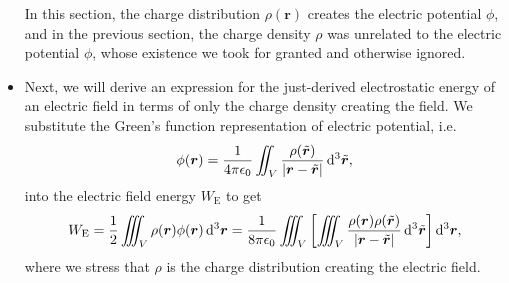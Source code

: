 \documentclass[11pt, a4paper]{article}
\newcommand{\diff}{\mathop{}\!\mathrm{d}} %
\newcommand{\dr}{\diff^{3} \r}  %
\newcommand{\dtr}{\diff^{3} \tilde{\r}}  %
\renewcommand{\vec}[1]{\bm{#1}} %
\renewcommand{\t}[1]{\tilde{#1}} %
\renewcommand{\r}{\vec{r}}
\newcommand{\ee}{\epsilon_{0}}  %
\begin{document}
\begin{itemize}
	In this section, the charge distribution $ \rho(\r) $ creates the electric potential $ \phi $, and in the previous section, the charge density $ \rho $ was unrelated to the electric potential $ \phi $, whose existence we took for granted and otherwise ignored.
	
	\item Next, we will derive an expression for the just-derived electrostatic energy of an electric field in terms of only the charge density creating the field. We substitute the Green's function representation of electric potential, i.e.
	\begin{equation*}
		\phi(\r) = \frac{1}{4\pi \ee}\iint_{V} \frac{\rho(\t{\r})}{\abs{\r - \t{\r}}} \dtr,
	\end{equation*}
	into the electric field energy $ W_{\text{E}} $ to get
	\begin{equation*}
		W_{\text{E}} = \frac{1}{2} \iiint_{V} \rho(\r) \phi(\r) \dr = \frac{1}{8 \pi \ee} \iiint_{V} \left[\iiint_{V} \frac{\rho(\r) \rho(\t{\r})}{\abs{\r - \t{\r}}} \dtr\right] \dr,
	\end{equation*}
	where we stress that $ \rho $ is the charge distribution creating the electric field.
\end{itemize}
\end{document}
